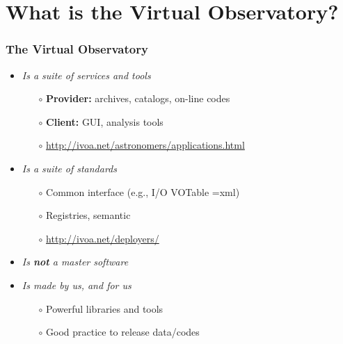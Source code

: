 \section{What is the Virtual Observatory?}

\begin{frame}
  \frametitle{The Virtual Observatory}

  \begin{itemize}[<+->]
    \item \emph{Is a suite of services and tools}
      \begin{itemize}[<.->]
        \item[$\circ$] \textbf{Provider:} archives, catalogs, on-line codes
        \item[$\circ$] \textbf{Client:} GUI, analysis tools
        \item[$\circ$] \url{http://ivoa.net/astronomers/applications.html}
      \end{itemize}

    \vspace{1em}
    \item \emph{Is a suite of standards}
      \begin{itemize}[<.->]
        \item[$\circ$] Common interface (e.g., I/O VOTable =xml)
        \item[$\circ$] Registries, semantic
        \item[$\circ$] \url{http://ivoa.net/deployers/}
      \end{itemize}

    \vspace{1em}
    \item \emph{Is \textbf{not} a master software}

    \vspace{1em}
    \item \emph{Is made by us, and for us}
      \begin{itemize}[<.->]
        \item[$\circ$] Powerful libraries and tools
        \item[$\circ$] Good practice to release data/codes
      \end{itemize}

  \end{itemize}

\end{frame}


